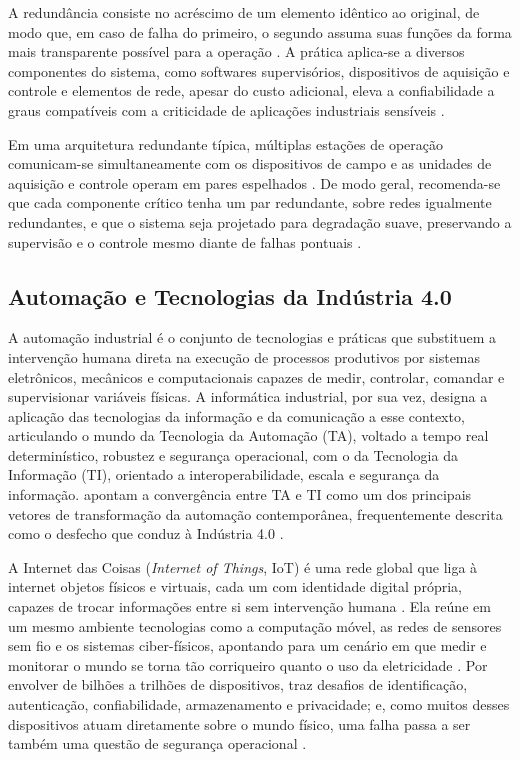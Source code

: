 \par A redundância consiste no acréscimo de um elemento idêntico ao original, de modo que, em caso de falha do primeiro, o segundo assuma suas funções da forma mais transparente possível para a operação \cite{ZANGHI2019_SCADA_CONCEITOS}. A prática aplica-se a diversos componentes do sistema, como softwares supervisórios, dispositivos de aquisição e controle e elementos de rede, apesar do custo adicional, eleva a confiabilidade a graus compatíveis com a criticidade de aplicações industriais sensíveis \cite{SALVADOR2019_AQUISICAO_REDUNDANCIA}.

\par Em uma arquitetura redundante típica, múltiplas estações de operação comunicam-se simultaneamente com os dispositivos de campo e as unidades de aquisição e controle operam em pares espelhados \cite{ZANGHI2019_SCADA_CONCEITOS}. De modo geral, recomenda-se que cada componente crítico tenha um par redundante, sobre redes igualmente redundantes, e que o sistema seja projetado para degradação suave, preservando a supervisão e o controle mesmo diante de falhas pontuais \cite{STOUFFER2015_NIST_ICS_SECURITY}.

\subsection{Automação e Tecnologias da Indústria 4.0}

\par A automação industrial é o conjunto de tecnologias e práticas que substituem a intervenção humana direta na execução de processos produtivos por sistemas eletrônicos, mecânicos e computacionais capazes de medir, controlar, comandar e supervisionar variáveis físicas. A informática industrial, por sua vez, designa a aplicação das tecnologias da informação e da comunicação a esse contexto, articulando o mundo da Tecnologia da Automação (TA), voltado a tempo real determinístico, robustez e segurança operacional, com o da Tecnologia da Informação (TI), orientado a interoperabilidade, escala e segurança da informação. \textcite{COLOMBO2014_STATE_ART_AUTOMATION} apontam a convergência entre TA e TI como um dos principais vetores de transformação da automação contemporânea, frequentemente descrita como o desfecho que conduz à Indústria 4.0 \cite{PISCHING2017,BIGHETI2020}.

\par A Internet das Coisas (\emph{Internet of Things}, IoT) é uma rede global que liga à internet objetos físicos e virtuais, cada um com identidade digital própria, capazes de trocar informações entre si sem intervenção humana \cite{PISCHING2017,BIGHETI2020}. Ela reúne em um mesmo ambiente tecnologias como a computação móvel, as redes de sensores sem fio e os sistemas ciber-físicos, apontando para um cenário em que medir e monitorar o mundo se torna tão corriqueiro quanto o uso da eletricidade \cite{STANKOVIC2014_IOT_RESEARCH_DIRECTIONS}. Por envolver de bilhões a trilhões de dispositivos, traz desafios de identificação, autenticação, confiabilidade, armazenamento e privacidade; e, como muitos desses dispositivos atuam diretamente sobre o mundo físico, uma falha passa a ser também uma questão de segurança operacional \cite{STANKOVIC2014_IOT_RESEARCH_DIRECTIONS}.

